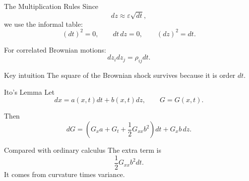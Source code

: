 \documentclass[aspectratio=169,11pt]{beamer}
\newcommand{\eps}{\varepsilon}
\begin{document}
\begin{frame}[label=quadvar_main]{The Multiplication Rules}
    Since
    \[
        dz\approx \eps\sqrt{dt},
    \]
    we use the informal table:
    \[
        (dt)^2=0,
        \qquad
        dt\,dz=0,
        \qquad
        (dz)^2=dt.
    \]

    For correlated Brownian motions:
    \[
        dz_i dz_j=\rho_{ij}dt.
    \]

    \begin{alertblock}{Key intuition}
        The square of the Brownian shock survives because it is order \(dt\).
    \end{alertblock}

    \hyperlink{deriv_quadratic_variation}{}
\end{frame}

\begin{frame}[label=ito_statement]{Ito's Lemma}
    Let
    \[
        dx=a(x,t)dt+b(x,t)dz,
        \qquad
        G=G(x,t).
    \]

    Then
    \[
        dG
        =
        \left(
            G_xa+G_t+\frac{1}{2}G_{xx}b^2
        \right)dt
        +
        G_xb\,dz.
    \]

    \begin{alertblock}{Compared with ordinary calculus}
        The extra term is
        \[
            \frac{1}{2}G_{xx}b^2dt.
        \]
        It comes from curvature times variance.
    \end{alertblock}

    \hyperlink{deriv_ito}{}
\end{frame}
\end{document}
